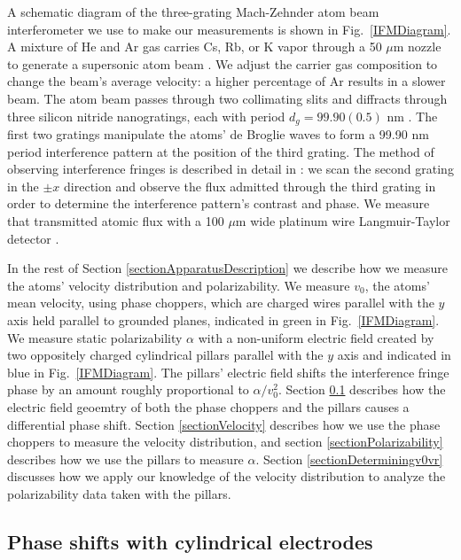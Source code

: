 \documentclass[twocolumn,pra,showpacs,superscriptaddress,longbibliography]{revtex4-1}   %
\newcommand{\figref}[1]{Fig.~\ref{#1}}
\begin{document}
A schematic diagram of the three-grating Mach-Zehnder atom beam interferometer we use to make our measurements is shown in \figref{IFMDiagram}. 
A mixture of He and Ar gas carries Cs, Rb, or K vapor through a 50 $\mu$m nozzle to generate a supersonic atom beam \cite{Scoles,Ekstrom1993}. We adjust the carrier gas composition to change the beam's average velocity: a higher percentage of Ar results in a slower beam.
The atom beam passes through two collimating slits and diffracts through three silicon nitride nanogratings, each with period $d_g = 99.90(0.5)$ nm \cite{Savas1995,Savas2003}.
The first two gratings manipulate the atoms' de Broglie waves to form a 99.90 nm period interference pattern at the position of the third grating. 
The method of observing interference fringes is described in detail in \cite{Kokorowski2001}: we scan the second grating in the $\pm x$ direction and observe the flux admitted through the third grating in order to determine the interference pattern's contrast and phase.
We measure that transmitted atomic flux with a 100 $\mu$m wide platinum wire Langmuir-Taylor detector \cite{Delhuille2002}.

In the rest of Section \ref{sectionApparatusDescription} we describe how we measure the atoms' velocity distribution and polarizability.
We measure $v_0$, the atoms' mean velocity, using phase choppers, which are charged wires parallel with the $y$ axis held parallel to grounded planes, indicated in green in \figref{IFMDiagram}.
We measure static polarizability $\alpha$ with a non-uniform electric field created by two oppositely charged cylindrical pillars parallel with the $y$ axis and indicated in blue in \figref{IFMDiagram}. The pillars' electric field shifts the interference fringe phase by an amount roughly proportional to $\alpha/v_0^2$. 
Section \ref{sectionPhaseShifts} describes how the electric field geoemtry of both the phase choppers and the pillars causes a differential phase shift. Section \ref{sectionVelocity} describes how we use the phase choppers to measure the velocity distribution, and section \ref{sectionPolarizability} describes how we use the pillars to measure $\alpha$. Section \ref{sectionDeterminingv0vr} discusses how we apply our knowledge of the velocity distribution to analyze the polarizability data taken with the pillars.


\subsection{Phase shifts with cylindrical electrodes} \label{sectionPhaseShifts}
\end{document}
